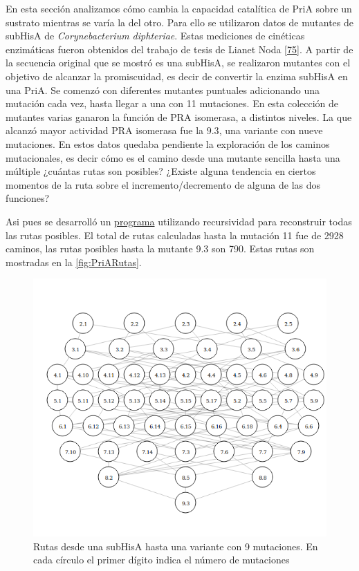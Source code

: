 \documentclass[12pt,twoside]{reedthesis}
\begin{document}
  En esta sección analizamos cómo cambia la capacidad catalítica de PriA
  sobre un sustrato mientras se varía la del otro. Para ello se utilizaron
  datos de mutantes de subHisA de \emph{Corynebacterium diphteriae}. Estas
  mediciones de cinéticas enzimáticas fueron obtenidos del trabajo de
  tesis de Lianet Noda {[}\protect\hyperlink{ref-noda_tesis_2012}{75}{]}.
  A partir de la secuencia original que se mostró es una subHisA, se
  realizaron mutantes con el objetivo de alcanzar la promiscuidad, es
  decir de convertir la enzima subHisA en una PriA. Se comenzó con
  diferentes mutantes puntuales adicionando una mutación cada vez, hasta
  llegar a una con 11 mutaciones. En esta colección de mutantes varias
  ganaron la función de PRA isomerasa, a distintos niveles. La que alcanzó
  mayor actividad PRA isomerasa fue la \(9.3\), una variante con nueve
  mutaciones. En estos datos quedaba pendiente la exploración de los
  caminos mutacionales, es decir cómo es el camino desde una mutante
  sencilla hasta una múltiple ¿cuántas rutas son posibles? ¿Existe alguna
  tendencia en ciertos momentos de la ruta sobre el incremento/decremento
  de alguna de las dos funciones?
  
  Asi pues se desarrolló un
  \href{https://github.com/nselem/perlas/tree/master/LiaTrayectory}{programa}
  utilizando recursividad para reconstruir todas las rutas posibles. El
  total de rutas calculadas hasta la mutación 11 fue de 2928 caminos, las
  rutas posibles hasta la mutante 9.3 son 790. Estas rutas son mostradas
  en la \autoref{fig:PriARutas}.
  
  \begin{figure}[h!tbp]
  \centering
  \includegraphics[angle = 0,scale = 0.6]{conclusion/Solocirculos.png}
  \caption[Rutas desde una subHisA hasta una variante con 9 mutaciones]{\footnotesize{Rutas desde una subHisA hasta una variante con 9 mutaciones. En cada círculo el primer dígito indica el número de mutaciones}}
  \label{fig:PriARutas}
  \end{figure}
  
\end{document}
